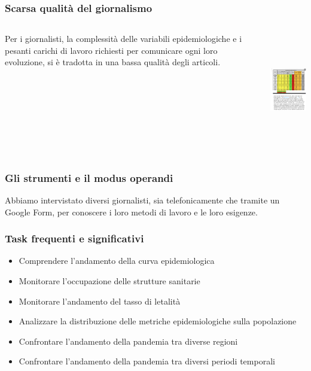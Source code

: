\documentclass[handout]{beamer}
\begin{document}
		\begin{frame}
			\frametitle{Scarsa qualità del giornalismo}
			\begin{columns}[t]
				\begin{column}[T]{5cm}
					Per i giornalisti, la complessità delle variabili epidemiologiche e i pesanti carichi di lavoro richiesti per comunicare ogni loro evoluzione, si è tradotta in una bassa qualità degli articoli.
				\end{column}

				\begin{column}[T]{5cm}
					\includegraphics[height=5cm]{img/esempio-articolo-brutto}
				\end{column}
			\end{columns}
		\end{frame}

		\begin{frame}
			\frametitle{Gli strumenti e il modus operandi}
			Abbiamo intervistato diversi giornalisti, sia telefonicamente che tramite un Google Form, per conoscere i loro metodi di lavoro e le loro esigenze.
		\end{frame}

		\begin{frame}
			\frametitle{Task frequenti e significativi}
			\begin{itemize}[<+->]
				\item Comprendere l'andamento della curva epidemiologica\\
				\item Monitorare l'occupazione delle strutture sanitarie\\
				\item Monitorare l'andamento del tasso di letalità\\
				\item Analizzare la distribuzione delle metriche epidemiologiche sulla popolazione\\
				\item Confrontare l'andamento della pandemia tra diverse regioni\\
				\item Confrontare l'andamento della pandemia tra diversi periodi temporali\\
			\end{itemize}
		\end{frame}
\end{document}
